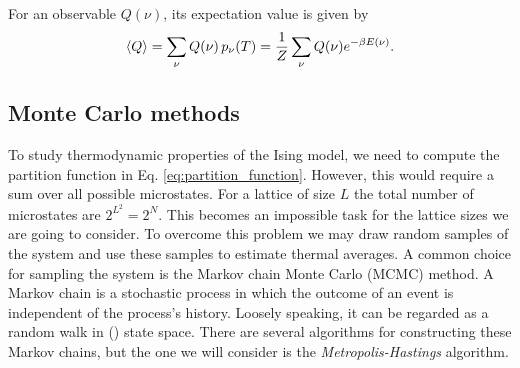 For an observable $Q(\nu)$, its expectation value is given by 
\begin{equation}\label{eq:observable_exp_val}
    \expval{Q} = \sum_{\nu} Q(\nu)\, p_\nu(T) = \frac{1}{Z} \sum_\nu Q(\nu) e^{-\beta E(\nu)}.
\end{equation}



\subsection{Monte Carlo methods} \label{subsec_theory:MC_methods}

To study thermodynamic properties of the Ising model, we need to compute the partition function in Eq. \eqref{eq:partition_function}. However, this would require a sum over all possible microstates. For a lattice of size $L$ the total number of  microstates are $2^{L^2}=2^N$. This becomes an impossible task for the lattice sizes we are going to consider. To overcome this problem we may draw random samples of the system and use these samples to estimate thermal averages. A common choice for sampling the system is the Markov chain Monte Carlo (MCMC) method. A Markov chain is a stochastic process in which the outcome of an event is independent of the process's history. Loosely speaking, it can be regarded as a random walk in () state space. There are several algorithms for constructing these Markov chains, but the one we will consider is the \textit{Metropolis-Hastings} algorithm. 

